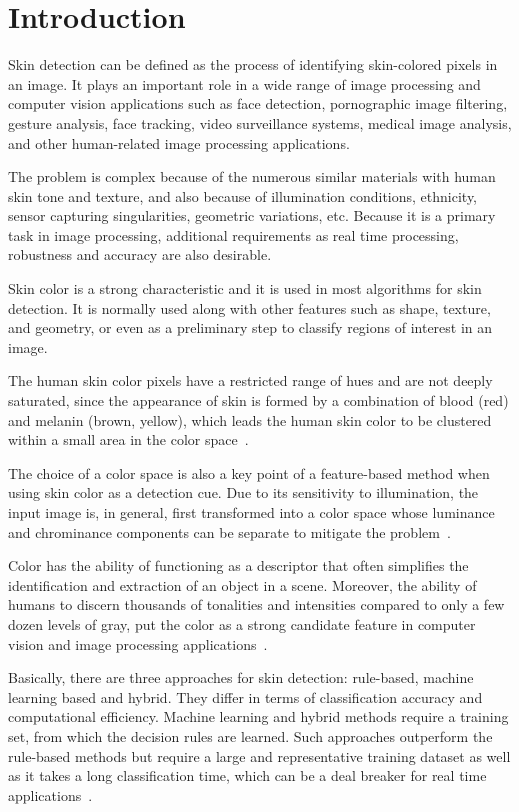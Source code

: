 \chapter{Introduction}
\label{cap:introducao}
Skin detection can be defined as the process of identifying skin-colored pixels in an image. It plays an important role in a wide range of image processing and computer vision applications such as face detection, pornographic image filtering, gesture analysis, face tracking, video surveillance systems, medical image analysis, and other human-related image processing applications.

The problem is complex because of the numerous similar materials with human skin tone and texture, and also because of illumination conditions, ethnicity, sensor capturing singularities, geometric variations, etc. Because it is a primary task in image processing, additional requirements as real time processing, robustness and accuracy are also desirable.

Skin color is a strong characteristic and it is used in most algorithms for skin detection. It is normally used along with other features such as shape, texture, and geometry, or even as a preliminary step to classify regions of interest in an image.

The human skin color pixels have a restricted range of hues and are not deeply saturated, since the appearance of skin is formed by a combination of blood (red) and melanin (brown, yellow), which leads the human skin color to be clustered within a small area in the color space~\citep{fleck:96}.

The choice of a color space is also a key point of a feature-based method when using skin color as a detection cue. Due to its sensitivity to illumination, the input image is, in general, first transformed into a color space whose luminance and chrominance components can be separate to mitigate the problem~\citep{vezhnevets:03}.

Color has the ability of functioning as a descriptor that often simplifies the identification and extraction of an object in a scene. Moreover, the ability of humans to discern thousands of tonalities and intensities compared to only a few dozen levels of gray, put the color as a strong candidate feature in computer vision and image processing applications~\citep{gonzalez:02}.

Basically, there are three approaches for skin detection: rule-based, machine learning based and hybrid. They differ in terms of classification accuracy and computational efficiency. Machine learning and hybrid methods require a training set, from which the decision rules are learned. Such approaches outperform the rule-based methods but require a large and representative training dataset as well as it takes a long classification time, which can be a deal breaker for real time applications~\citep{kakumanu:07}.

